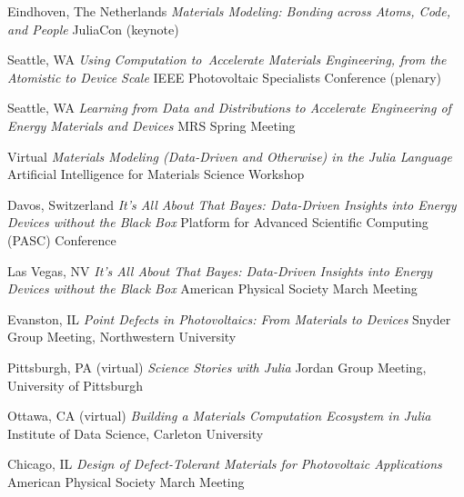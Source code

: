         {Eindhoven, The Netherlands}
        {\textit{Materials Modeling: Bonding across Atoms, Code, and People}}
        {JuliaCon (keynote)}

\vspace{\talkyearsep}
\datedsubsection{}
        {Seattle, WA}
        {\textit{Using Computation to Accelerate Materials Engineering, from the Atomistic to Device Scale}}
        {IEEE Photovoltaic Specialists Conference (plenary)}

\vspace{\talksep}
\datedsubsection{}
        {Seattle, WA}
        {\textit{Learning from Data and Distributions to Accelerate Engineering of Energy Materials and Devices}}
        {MRS Spring Meeting}

\vspace{\talksep}
    {Virtual}
    {\textit{Materials Modeling (Data-Driven and Otherwise) in the Julia Language}}
    {Artificial Intelligence for Materials Science Workshop}

\vspace{\talksep}
\datedsubsection{}
    {Davos, Switzerland}
    {\textit{It's All About That Bayes: Data-Driven Insights into Energy Devices without the Black Box}}
    {Platform for Advanced Scientific Computing (PASC) Conference}

\vspace{\talksep}
\datedsubsection{}
    {Las Vegas, NV}
    {\textit{It's All About That Bayes: Data-Driven Insights into Energy Devices without the Black Box}}
    {American Physical Society March Meeting}

\vspace{\talksep}
\datedsubsection{}
    {Evanston, IL}
    {\textit{Point Defects in Photovoltaics: From Materials to Devices}}
    {Snyder Group Meeting, Northwestern University}

\vspace{\talkyearsep}
    {Pittsburgh, PA (virtual)}
    {\textit{Science Stories with Julia}}
    {Jordan Group Meeting, University of Pittsburgh}

\vspace{\talksep}
\datedsubsection{}
    {Ottawa, CA (virtual)}
    {\textit{Building a Materials Computation Ecosystem in Julia}}
    {Institute of Data Science, Carleton University}

\vspace{\talksep}
\datedsubsection{}
    {Chicago, IL}
    {\textit{Design of Defect-Tolerant Materials for Photovoltaic Applications}}
    {American Physical Society March Meeting}

